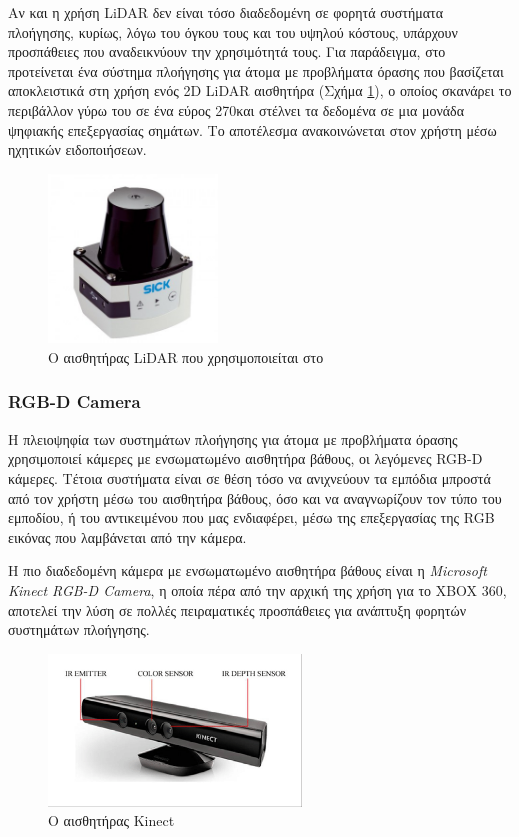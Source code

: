 Αν και η χρήση LiDAR δεν είναι τόσο διαδεδομένη σε φορητά συστήματα πλοήγησης, κυρίως, λόγω του όγκου τους και του υψηλού κόστους, υπάρχουν προσπάθειες που αναδεικνύουν την χρησιμότητά τους. Για παράδειγμα, στο \cite{miles2016lidar} προτείνεται ένα σύστημα πλοήγησης για άτομα με προβλήματα όρασης που βασίζεται αποκλειστικά στη χρήση ενός 2D LiDAR αισθητήρα (Σχήμα \ref{fig:lidar-example}), ο οποίος σκανάρει το περιβάλλον γύρω του σε ένα εύρος 270\degree και στέλνει τα δεδομένα σε μια μονάδα ψηφιακής επεξεργασίας σημάτων. Το αποτέλεσμα ανακοινώνεται στον χρήστη μέσω ηχητικών ειδοποιήσεων.
\begin{figure}[H]
    \centering
    \includegraphics[width=0.4\textwidth]{images/lidar_example.jpg}
    \caption{Ο αισθητήρας LiDAR που χρησιμοποιείται στο \cite{miles2016lidar}}
    \label{fig:lidar-example}
\end{figure}
\hspace{1cm}

\subsubsection{RGB-D Camera}
Η πλειοψηφία των συστημάτων πλοήγησης για άτομα με προβλήματα όρασης χρησιμοποιεί κάμερες με ενσωματωμένο αισθητήρα βάθους, οι λεγόμενες RGB-D κάμερες. Τέτοια συστήματα είναι σε θέση τόσο να ανιχνεύουν τα εμπόδια μπροστά από τον χρήστη μέσω του αισθητήρα βάθους, όσο και να αναγνωρίζουν τον τύπο του εμποδίου, ή του αντικειμένου που μας ενδιαφέρει, μέσω της επεξεργασίας της RGB εικόνας που λαμβάνεται από την κάμερα.

Η πιο διαδεδομένη κάμερα με ενσωματωμένο αισθητήρα βάθους είναι η \textit{Microsoft Kinect RGB-D Camera}, η οποία πέρα από την αρχική της χρήση για το XBOX 360, αποτελεί την λύση σε πολλές πειραματικές προσπάθειες για ανάπτυξη φορητών συστημάτων πλοήγησης.
\begin{figure}[H]
    \centering
    \includegraphics[width=0.6\textwidth]{images/kinect2.png}
    \caption{Ο αισθητήρας Kinect}
    \label{fig:kinect}
\end{figure}
\hspace{1cm}

